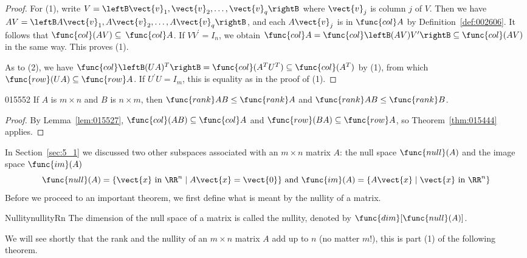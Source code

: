 \begin{proof}
For (1), write $V = \leftB \vect{v}_{1}, \vect{v}_{2}, \dots, \vect{v}_{q}\rightB$ where $\vect{v}_{j}$ is column $j$ of $V$. Then we have \newline $AV = \leftB A\vect{v}_{1}, A\vect{v}_{2}, \dots, A\vect{v}_{q}\rightB$, and each $A\vect{v}_{j}$ is in $\func{col} A$ by Definition~\ref{def:002606}. It follows that $\func{col}(AV) \subseteq $
 $\func{col} A$. If $VV^{\prime}=I_{n}$, we obtain $\func{col} A = \func{col}\leftB (AV)V^{\prime} \rightB \subseteq \func{col}(AV)$ in the same way. This proves (1).

As to (2), we have $\func{col}\leftB (UA)^{T}\rightB = \func{col}(A^{T}U^{T}) \subseteq \func{col}(A^{T})$ by (1), from which $\func{row}(UA) \subseteq \func{row} A$. If $U^{\prime}U=I_{m}$, this is equality as in the proof of (1).
\end{proof}

\begin{corollary}{}{015552}
If $A$ is $m \times n$ and $B$ is $n \times m$, then $\func{rank} AB \leq \func{rank} A$ and $\func{rank} AB \leq \func{rank} B$.
\end{corollary}

\begin{proof}
By Lemma~\ref{lem:015527}, $\func{col}(AB) \subseteq \func{col} A$ and $\func{row}(BA) \subseteq \func{row} A$, so Theorem~\ref{thm:015444} applies.
\end{proof}

In Section~\ref{sec:5_1} we discussed two other subspaces associated with an $m \times n$ matrix $A$: the null space $\func{null}(A)$ and the image space $\func{im}(A)$
\begin{equation*}
\func{null} (A) = \{\vect{x} \mbox{ in } \RR^n \mid A\vect{x} = \vect{0} \}
\mbox{ and } \func{im} (A) = \{A\vect{x} \mid \vect{x} \mbox{ in } \RR^n \}
\end{equation*}
Before we proceed to an important theorem, we first define what is meant by the nullity  of a matrix. 

\begin{definition}{Nullity}{nullityRn}
The dimension of the null space of a matrix is called the nullity, denoted by $\func{dim}[\func{null}(A)]$.
\end{definition}

We will see shortly that the rank and the nullity of an $m \times n$ matrix $A$ add up to $n$ (no matter $m$!), this is part (1) of the following theorem.

